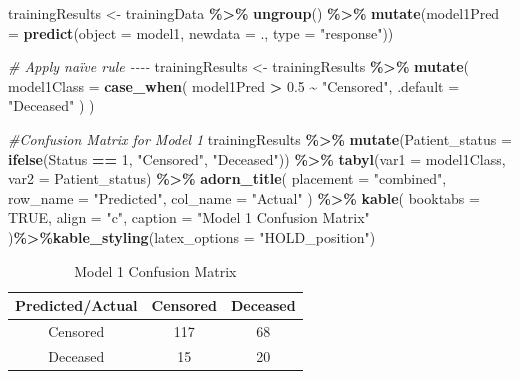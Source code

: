 \documentclass[
]{article}
\newenvironment{Shaded}{\begin{snugshade}}{\end{snugshade}}
\newcommand{\AttributeTok}[1]{\textcolor[rgb]{0.13,0.29,0.53}{#1}}
\newcommand{\CommentTok}[1]{\textcolor[rgb]{0.56,0.35,0.01}{\textit{#1}}}
\newcommand{\ConstantTok}[1]{\textcolor[rgb]{0.56,0.35,0.01}{#1}}
\newcommand{\DecValTok}[1]{\textcolor[rgb]{0.00,0.00,0.81}{#1}}
\newcommand{\FloatTok}[1]{\textcolor[rgb]{0.00,0.00,0.81}{#1}}
\newcommand{\FunctionTok}[1]{\textcolor[rgb]{0.13,0.29,0.53}{\textbf{#1}}}
\newcommand{\NormalTok}[1]{#1}
\newcommand{\OtherTok}[1]{\textcolor[rgb]{0.56,0.35,0.01}{#1}}
\newcommand{\SpecialCharTok}[1]{\textcolor[rgb]{0.81,0.36,0.00}{\textbf{#1}}}
\newcommand{\StringTok}[1]{\textcolor[rgb]{0.31,0.60,0.02}{#1}}
\begin{document}
\begin{Shaded}
\begin{Highlighting}[]
\NormalTok{trainingResults }\OtherTok{\textless{}{-}}\NormalTok{ trainingData }\SpecialCharTok{\%\textgreater{}\%}
  \FunctionTok{ungroup}\NormalTok{() }\SpecialCharTok{\%\textgreater{}\%}
  \FunctionTok{mutate}\NormalTok{(}\AttributeTok{model1Pred =} \FunctionTok{predict}\NormalTok{(}\AttributeTok{object =}\NormalTok{ model1, }\AttributeTok{newdata =}\NormalTok{ ., }\AttributeTok{type =} \StringTok{"response"}\NormalTok{))}

\CommentTok{\# Apply naïve rule {-}{-}{-}{-}}
\NormalTok{trainingResults }\OtherTok{\textless{}{-}}\NormalTok{ trainingResults }\SpecialCharTok{\%\textgreater{}\%}
  \FunctionTok{mutate}\NormalTok{(}
    \AttributeTok{model1Class =} \FunctionTok{case\_when}\NormalTok{(}
\NormalTok{      model1Pred }\SpecialCharTok{\textgreater{}} \FloatTok{0.5} \SpecialCharTok{\textasciitilde{}} \StringTok{"Censored"}\NormalTok{,}
      \AttributeTok{.default =} \StringTok{"Deceased"}
\NormalTok{    )}
\NormalTok{  )}

\CommentTok{\#Confusion Matrix for Model 1}
\NormalTok{trainingResults }\SpecialCharTok{\%\textgreater{}\%}
  \FunctionTok{mutate}\NormalTok{(}\AttributeTok{Patient\_status =} \FunctionTok{ifelse}\NormalTok{(Status }\SpecialCharTok{==} \DecValTok{1}\NormalTok{, }\StringTok{"Censored"}\NormalTok{, }\StringTok{"Deceased"}\NormalTok{)) }\SpecialCharTok{\%\textgreater{}\%}
  \FunctionTok{tabyl}\NormalTok{(}\AttributeTok{var1 =}\NormalTok{ model1Class, }\AttributeTok{var2 =}\NormalTok{ Patient\_status) }\SpecialCharTok{\%\textgreater{}\%}
  \FunctionTok{adorn\_title}\NormalTok{(}
    \AttributeTok{placement =} \StringTok{"combined"}\NormalTok{,}
    \AttributeTok{row\_name =} \StringTok{"Predicted"}\NormalTok{,}
    \AttributeTok{col\_name =} \StringTok{"Actual"}
\NormalTok{  ) }\SpecialCharTok{\%\textgreater{}\%}
  \FunctionTok{kable}\NormalTok{(}
    \AttributeTok{booktabs =} \ConstantTok{TRUE}\NormalTok{,}
    \AttributeTok{align =} \StringTok{"c"}\NormalTok{,}
    \AttributeTok{caption =} \StringTok{"Model 1 Confusion Matrix"}
\NormalTok{  )}\SpecialCharTok{\%\textgreater{}\%}\FunctionTok{kable\_styling}\NormalTok{(}\AttributeTok{latex\_options =} \StringTok{"HOLD\_position"}\NormalTok{)}
\end{Highlighting}
\end{Shaded}

\begin{table}[H]

\caption{\label{tab:unnamed-chunk-30}Model 1 Confusion Matrix}
\centering
\begin{tabular}[t]{ccc}
\toprule
Predicted/Actual & Censored & Deceased\\
\midrule
Censored & 117 & 68\\
Deceased & 15 & 20\\
\bottomrule
\end{tabular}
\end{table}
\end{document}
